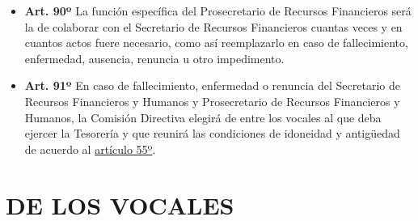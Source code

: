 \documentclass[]{book}
\begin{document}
\begin{itemize}
\item
  \textbf{Art. 90º} La función específica del Prosecretario de Recursos
  Financieros será la de colaborar con el Secretario de Recursos
  Financieros cuantas veces y en cuantos actos fuere necesario, como así
  reemplazarlo en caso de fallecimiento, enfermedad, ausencia, renuncia
  u otro impedimento.
\item
  \textbf{Art. 91º} En caso de fallecimiento, enfermedad o renuncia del
  Secretario de Recursos Financieros y Humanos y Prosecretario de
  Recursos Financieros y Humanos, la Comisión Directiva elegirá de entre
  los vocales al que deba ejercer la Tesorería y que reunirá las
  condiciones de idoneidad y antigüedad de acuerdo al
  \protect\hyperlink{art55}{artículo 55º}.
\end{itemize}

\chapter{DE LOS VOCALES}\label{de-los-vocales}
\end{document}
